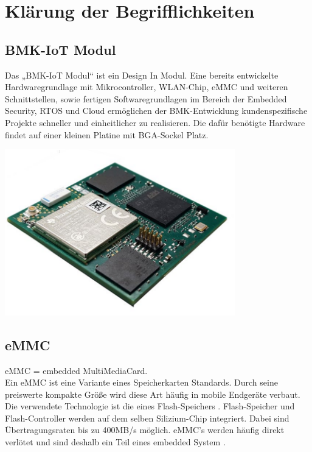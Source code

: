 

\section{Klärung der Begrifflichkeiten}

\subsection{BMK-IoT Modul}
Das „BMK-IoT Modul“ ist ein Design In Modul. Eine bereits entwickelte Hardwaregrundlage mit Mikrocontroller, WLAN-Chip, eMMC und weiteren Schnittstellen, sowie fertigen Softwaregrundlagen im Bereich der Embedded Security, RTOS und Cloud ermöglichen der BMK-Entwicklung kundenspezifische Projekte schneller und einheitlicher zu realisieren.
Die dafür benötigte Hardware findet auf einer kleinen Platine mit BGA-Sockel Platz. 

\begin{center}
\includegraphics[width=10cm]{Bilder/BMK-IOT-MODUL.png}
\end{center}

\subsection{eMMC}
eMMC = embedded MultiMediaCard.
\\
Ein \glqq eMMC \grqq{} ist eine Variante eines Speicherkarten Standards. Durch seine preiswerte kompakte Größe wird diese Art häufig in mobile Endgeräte verbaut. Die verwendete Technologie ist die eines Flash-Speichers . Flash-Speicher und Flash-Controller werden auf dem selben Silizium-Chip integriert. Dabei sind Übertragungsraten bis zu 400MB/s möglich. eMMC's werden häufig direkt verlötet und sind deshalb ein Teil eines \glqq embedded System \grqq{}.


